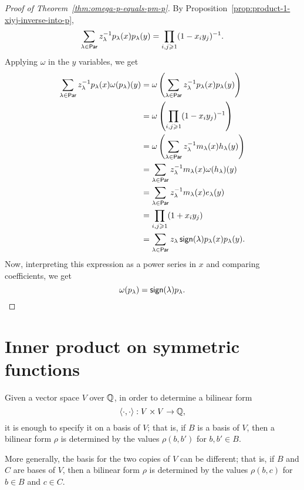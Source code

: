 \begin{proof}[Proof of Theorem~\ref{thm:omega-p-equals-pm-p}]
	By Proposition~\ref{prop:product-1-xiyj-inverse-into-p},
	\begin{equation}
		\sum_{\lambda \in \operatorname{\mathsf{Par}}} z_\lambda^{-1} p_\lambda(x) p_\lambda(y)
		=
		\prod_{i, j \geqslant 1} (1 - x_iy_j)^{-1}.
	\end{equation}
	Applying \(\omega\) in the \(y\) variables, we get
	\begin{align}
		\sum_{\lambda \in \operatorname{\mathsf{Par}}} z_\lambda^{-1} p_\lambda(x) \omega(p_\lambda)(y)
		&= \omega\left(\sum_{\lambda \in \operatorname{\mathsf{Par}}} z_\lambda^{-1} p_\lambda(x) p_\lambda(y)\right) \\
		&= \omega\left(\prod_{i, j \geqslant 1} (1 - x_iy_j)^{-1}\right) \\
		&= \omega\left(\sum_{\lambda \in \operatorname{\mathsf{Par}}} z_\lambda^{-1} m_\lambda(x) h_\lambda(y)\right) \\
		&= \sum_{\lambda \in \operatorname{\mathsf{Par}}} z_\lambda^{-1} m_\lambda(x) \omega(h_\lambda)(y) \\
		&= \sum_{\lambda \in \operatorname{\mathsf{Par}}} z_\lambda^{-1} m_\lambda(x) e_\lambda(y) \\
		&= \prod_{i, j \geqslant 1} (1 + x_iy_j) \\
		&= \sum_{\lambda \in \operatorname{\mathsf{Par}}} z_\lambda \operatorname{\mathsf{sign}}(\lambda) p_\lambda(x) p_\lambda(y).
	\end{align}
	Now, interpreting this expression as a power series in \(x\) and comparing coefficients, we get
	\begin{equation}
		\omega(p_\lambda) = \operatorname{\mathsf{sign}}(\lambda) p_\lambda. \qedhere
	\end{equation}
\end{proof}

\section{Inner product on symmetric functions}

Given a vector space \(V\) over \(\mathbb{Q}\),
in order to determine a bilinear form
\begin{equation}
	\langle \cdot, \cdot \rangle: V \times V \to \mathbb{Q},
\end{equation}
it is enough to specify it on a basis of \(V\);
that is,
if \(B\) is a basis of \(V\),
then a bilinear form \(\rho\) is determined by the values \(\rho(b, b')\) for \(b, b' \in B\).

More generally, the basis for the two copies of \(V\) can be different;
that is, if \(B\) and \(C\) are bases of \(V\),
then a bilinear form \(\rho\) is determined by the values \(\rho(b, c)\) for \(b \in B\) and \(c \in C\).


